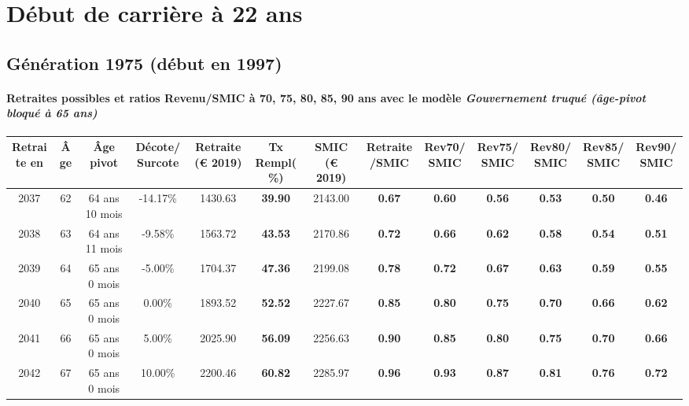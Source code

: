  \addto{\captionsenglish}{ \renewcommand{\mtctitle}{}} \setcounter{minitocdepth}{2} 
 \minitoc \newpage 

\section{Début de carrière à 22 ans} 

\subsection{Génération 1975 (début en 1997)} 

\paragraph{Retraites possibles et ratios Revenu/SMIC à 70, 75, 80, 85, 90 ans avec le modèle \emph{Gouvernement truqué (âge-pivot bloqué à 65 ans)}}  
 
{ \scriptsize \begin{center} 
\begin{tabular}[htb]{|c|c||c|c||c|c||c||c|c|c|c|c|c|} 
\hline 
 Retraite en &  Âge &  Âge pivot &  Décote/Surcote &  Retraite (\euro{} 2019) &  Tx Rempl(\%) &  SMIC (\euro{} 2019) &  Retraite/SMIC &  Rev70/SMIC &  Rev75/SMIC &  Rev80/SMIC &  Rev85/SMIC &  Rev90/SMIC \\ 
\hline \hline 
 2037 &  62 &  64 ans 10 mois &  -14.17\% &  1430.63 &  {\bf 39.90} &  2143.00 &  {\bf {\color{red} 0.67}} &  {\bf {\color{red} 0.60}} &  {\bf {\color{red} 0.56}} &  {\bf {\color{red} 0.53}} &  {\bf {\color{red} 0.50}} &  {\bf {\color{red} 0.46}} \\ 
\hline 
 2038 &  63 &  64 ans 11 mois &  -9.58\% &  1563.72 &  {\bf 43.53} &  2170.86 &  {\bf {\color{red} 0.72}} &  {\bf {\color{red} 0.66}} &  {\bf {\color{red} 0.62}} &  {\bf {\color{red} 0.58}} &  {\bf {\color{red} 0.54}} &  {\bf {\color{red} 0.51}} \\ 
\hline 
 2039 &  64 &  65 ans 0 mois &  -5.00\% &  1704.37 &  {\bf 47.36} &  2199.08 &  {\bf {\color{red} 0.78}} &  {\bf {\color{red} 0.72}} &  {\bf {\color{red} 0.67}} &  {\bf {\color{red} 0.63}} &  {\bf {\color{red} 0.59}} &  {\bf {\color{red} 0.55}} \\ 
\hline 
 2040 &  65 &  65 ans 0 mois &  0.00\% &  1893.52 &  {\bf 52.52} &  2227.67 &  {\bf {\color{red} 0.85}} &  {\bf {\color{red} 0.80}} &  {\bf {\color{red} 0.75}} &  {\bf {\color{red} 0.70}} &  {\bf {\color{red} 0.66}} &  {\bf {\color{red} 0.62}} \\ 
\hline 
 2041 &  66 &  65 ans 0 mois &  5.00\% &  2025.90 &  {\bf 56.09} &  2256.63 &  {\bf {\color{red} 0.90}} &  {\bf {\color{red} 0.85}} &  {\bf {\color{red} 0.80}} &  {\bf {\color{red} 0.75}} &  {\bf {\color{red} 0.70}} &  {\bf {\color{red} 0.66}} \\ 
\hline 
 2042 &  67 &  65 ans 0 mois &  10.00\% &  2200.46 &  {\bf 60.82} &  2285.97 &  {\bf {\color{red} 0.96}} &  {\bf {\color{red} 0.93}} &  {\bf {\color{red} 0.87}} &  {\bf {\color{red} 0.81}} &  {\bf {\color{red} 0.76}} &  {\bf {\color{red} 0.72}} \\ 
\hline 
\hline 
\end{tabular} 
\end{center} } 

